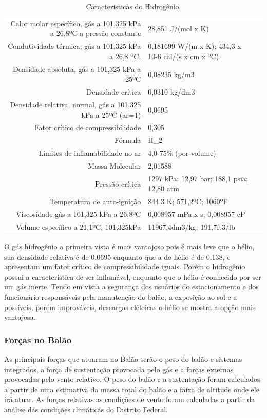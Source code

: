 \begin{table}[h]
\caption{Características do Hidrogênio.}
\vspace{0.5cm}
\begin{tabular}{|r|lr}
\hline

Calor molar específico, gás a 101,325 kPa a 
 26,8ºC a pressão constante &  28,851 J/(mol x K)\\
Condutividade térmica, gás a 101,325 kPa a 
 26,8 ºC. & 0,181699 W/(m x K);
 434,3 x 10-6 cal/(s x cm x ºC) \\ 
Densidade absoluta, gás a 101,325 kPa a 25ºC  & 0,08235 kg/m3 \\
Densidade crítica   & 0,0310 kg/dm3 \\
Densidade relativa, normal, gás a 101,325 kPa
 a 25ºC (ar=1) &  0,0695\\
Fator crítico de compressibilidade & 0,305 \\
Fórmula   & H_2 \\
 Limites de inflamabilidade no ar & 4,0-75\% (por volume)\\
Massa Molecular & 2,01588 \\
Pressão crítica  & 1297 kPa; 12,97 bar; 188,1 psia;  12,80 atm \\
Temperatura de auto-ignição & 844,3 K; 571,2ºC; 1060ºF\\
Viscosidade gás a 101,325 kPa a 26,8ºC  & 0,008957 mPa x s; 0,008957 cP\\
Volume específico a 21,1ºC, 101,325kPa & 11967,4dm3/kg; 191,7ft3/lb\\

\hline
\end{tabular}
\end{table}

    O gás hidrogênio a primeira vista é mais vantajoso pois é mais leve que o hélio, sua densidade relativa é de 0.0695 enquanto que a do hélio é de 0.138, e apresentam um fator crítico de compressibilidade iguais. Porém o hidrogênio possui a característica de ser inflamável, enquanto que o hélio é conhecido por ser um gás inerte. Tendo em vista a segurança dos usuários do estacionamento e dos funcionário responsáveis pela manutenção do balão, a exposição ao sol e a possíveis, porém improváveis,  descargas elétricas o hélio se mostra a opção mais vantajosa.
    
    \subsubsection{Forças no Balão}
    As principais forças que atuaram no Balão serão o peso do balão e sistemas integrados, a força de sustentação provocada pelo gás e a forças externas provocadas pelo vento relativo. O peso do balão e a sustentação foram calculados a partir de uma estimativa da massa total do balão e a faixa de altitude onde ele irá atuar. As forças relativas as condições de vento foram calculadas a partir da análise das condições climáticas do Distrito Federal.
    
